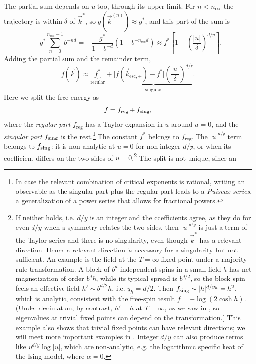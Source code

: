 The partial sum depends on $u$ too, through its upper limit. For
$n<n_\text{esc}$ the trajectory is within $\delta$ of $\vec{k}^*$, so
$g(\vec{k}^{(n)})\approx g^*$, and this part of the sum is
\begin{equation}
  -g^*\sum_{n=0}^{n_\text{esc}-1}b^{-nd}
  =-\frac{g^*}{1-b^{-d}}\left(1-b^{-n_\text{esc}d}\right)
  \approx f^*\left[1-\left(\frac{|u|}{\delta}\right)^{d/y}\right].
\end{equation}
Adding the partial sum and the remainder term,
\begin{equation}
  f(\vec{k})\approx\underbrace{f^*}_{\text{regular}}
  +\underbrace{\big[f(\vec{k}_{\text{esc},\pm})-f^*\big]
    \left(\frac{|u|}{\delta}\right)^{d/y}}_{\text{singular}}.
\end{equation}
Here we split the free energy as
\begin{equation}
  f=f_\text{reg}+f_{\text{sing}},
\end{equation}
where the {\it regular part} $f_\text{reg}$ has a Taylor expansion
in $u$ around $u=0$, and the {\it singular part} $f_{\text{sing}}$ is the
rest.\footnote{In case the relevant combination of critical exponents is
rational, writing an observable as the singular part plus the regular part
leads to a {\it Puiseux series}, a generalization of a
power series that allows for fractional powers.} The constant
$f^*$ belongs to $f_\text{reg}$. The $|u|^{d/y}$ term belongs to $f_{\text{sing}}$: it is
non-analytic at $u=0$ for non-integer $d/y$, or when its coefficient
differs on the two sides of $u=0$.\footnote{If neither holds, i.e. $d/y$ is an
integer and the coefficients agree, as they do for even $d/y$ when a symmetry
relates the two sides, then $|u|^{d/y}$ is just a term of the Taylor series and
there is no singularity, even though $\vec{k}^*$ has a relevant direction. Hence a
relevant direction is necessary for a singularity but not sufficient. An
example is the field at the $T=\infty$ fixed point under a majority-rule
transformation. A block of $b^d$ independent spins in a small field $h$ has net
magnetization of order $b^dh$, while its typical spread is $b^{d/2}$, so the
block spin feels an effective field $h'\sim b^{d/2}h$, i.e. $y_h=d/2$. Then
$f_{\text{sing}}\sim|h|^{d/y_h}=h^2$, which is analytic, consistent with the free-spin
result $f=-\log(2\cosh h)$. (Under decimation, by contrast, $h'=h$ at $T=\infty$, as we
saw in , so eigenvalues at trivial fixed points can
depend on the transformation.) This example also shows that trivial fixed points
can have relevant directions; we will meet more important examples in
. Integer $d/y$ can also produce terms like
$u^{d/y}\log|u|$, which are non-analytic, e.g. the logarithmic specific heat of
the  Ising model, where $\alpha=0$.} The split is not unique, since an
